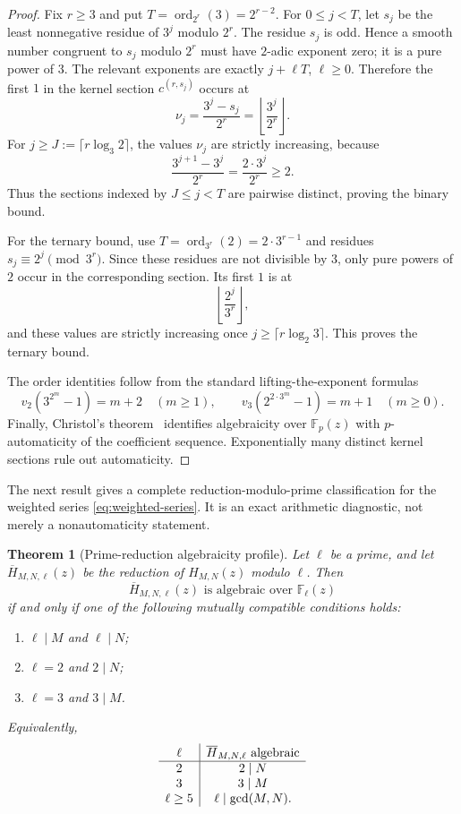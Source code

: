 \documentclass[11pt]{article}
\newtheorem{theorem}{Theorem}[section]
\theoremstyle{definition}
\newcommand{\F}{\mathbb{F}}
\newcommand{\ord}{\operatorname{ord}}
\begin{document}
\begin{proof}
Fix $r\geq3$ and put $T=\ord_{2^r}(3)=2^{r-2}$.  For
$0\leq j<T$, let $s_j$ be the least nonnegative residue of $3^j$ modulo
$2^r$.  The residue $s_j$ is odd.  Hence a smooth number congruent to $s_j$
modulo $2^r$ must have $2$-adic exponent zero; it is a pure power of $3$.
The relevant exponents are exactly $j+\ell T$, $\ell\geq0$.  Therefore the
first $1$ in the kernel section $c^{(r,s_j)}$ occurs at
\[
       \nu_j=\frac{3^j-s_j}{2^r}
            =\left\lfloor\frac{3^j}{2^r}\right\rfloor.
\]
For
$j\geq J:=\lceil r\log_3 2\rceil$, the values $\nu_j$ are strictly increasing,
because
\[
 \frac{3^{j+1}-3^j}{2^r}
 =\frac{2\cdot3^j}{2^r}\geq2.
\]
Thus the sections indexed by $J\leq j<T$ are pairwise distinct, proving the
binary bound.

For the ternary bound, use
$T=\ord_{3^r}(2)=2\cdot3^{r-1}$ and residues
$s_j\equiv2^j\pmod{3^r}$.  Since these residues are not divisible by $3$, only
pure powers of $2$ occur in the corresponding section.  Its first $1$ is at
\[
       \left\lfloor\frac{2^j}{3^r}\right\rfloor,
\]
and these values are strictly increasing once
$j\geq\lceil r\log_2 3\rceil$.  This proves the ternary bound.

The order identities follow from the standard lifting-the-exponent formulas
\[
 v_2(3^{2^m}-1)=m+2\quad(m\geq1),
 \qquad
 v_3(2^{2\cdot3^m}-1)=m+1\quad(m\geq0).
\]
Finally, Christol's theorem~\cite{ChristolEtAl} identifies algebraicity over $\F_p(z)$ with
$p$-automaticity of the coefficient sequence.  Exponentially many distinct
kernel sections rule out automaticity.
\end{proof}

The next result gives a complete reduction-modulo-prime classification for
the weighted series \cref{eq:weighted-series}.  It is an exact arithmetic
diagnostic, not merely a nonautomaticity statement.

\begin{theorem}[Prime-reduction algebraicity profile]
\label{thm:modp-profile}
Let $\ell$ be a prime, and let $\overline{H}_{M,N,\ell}(z)$ be the reduction of
$H_{M,N}(z)$ modulo $\ell$.  Then
\[
 \overline{H}_{M,N,\ell}(z)
 \text{ is algebraic over }\F_\ell(z)
\]
if and only if one of the following mutually compatible conditions holds:
\begin{enumerate}[label=\textup{(\alph*)}]
\item $\ell\mid M$ and $\ell\mid N$;
\item $\ell=2$ and $2\mid N$;
\item $\ell=3$ and $3\mid M$.
\end{enumerate}
Equivalently,
\[
\begin{array}{c|c}
\ell & \overline{H}_{M,N,\ell}\text{ algebraic}\rule{0pt}{2.4ex}\\
\hline
2 & 2\mid N\\
3 & 3\mid M\\
\ell\geq5 & \ell\mid\gcd(M,N).
\end{array}
\]
\end{theorem}
\end{document}
